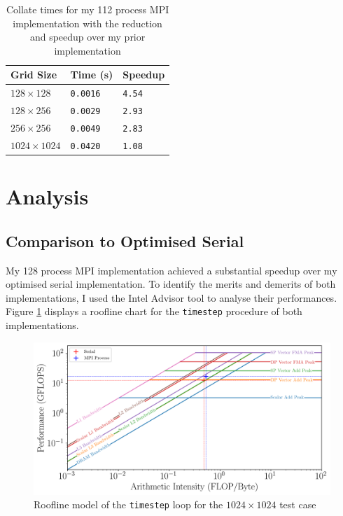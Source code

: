 \documentclass[twocolumn, a4paper]{article}
\begin{document}
\begin{table}[htbp]
  \begin{center}
  \caption{Collate times for my 112 process MPI implementation with the reduction and speedup over my prior implementation}\label{tab:reduction}
  \begin{tabular}[t]{l | l l} 
      \hline\hline
      Grid Size&Time (s)&Speedup\\
      \hline
      $128 \times 128$&\texttt{0.0016}&\texttt{4.54}\\
      $128 \times 256$&\texttt{0.0029}&\texttt{2.93}\\
      $256 \times 256$&\texttt{0.0049}&\texttt{2.83}\\
      $1024 \times 1024$&\texttt{0.0420}&\texttt{1.08}\\
      \hline
    \end{tabular}
  \end{center}
  \vspace{-1em}
\end{table}

\section{Analysis}

\subsection{Comparison to Optimised Serial}

My 128 process MPI implementation achieved a substantial speedup over my optimised serial implementation.
To identify the merits and demerits of both implementations, I used the Intel Advisor tool to analyse their performances.
Figure \ref{fig:roofline} displays a roofline chart for the \texttt{timestep} procedure of both implementations.

\begin{figure}[htbp]
  \centering
  \includegraphics[width=\linewidth]{roofline.png}
  \caption{Roofline model of the \texttt{timestep} loop for the $1024\times1024$ test case}\label{fig:roofline}
\end{figure}
\end{document}
